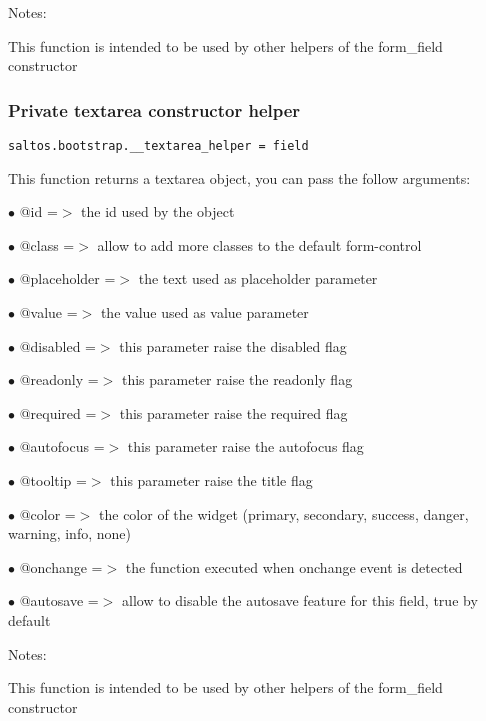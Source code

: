 \documentclass[a4paper]{article}
\begin{document}
Notes:

This function is intended to be used by other helpers of the form\_field constructor

\hypertarget{toc652}{}
\subsubsection{Private textarea constructor helper}

\begin{lstlisting}
saltos.bootstrap.__textarea_helper = field
\end{lstlisting}

This function returns a textarea object, you can pass the follow arguments:

\begin{compactitem}
\item[\color{myblue}$\bullet$] @id          =$>$ the id used by the object
\item[\color{myblue}$\bullet$] @class       =$>$ allow to add more classes to the default form-control
\item[\color{myblue}$\bullet$] @placeholder =$>$ the text used as placeholder parameter
\item[\color{myblue}$\bullet$] @value       =$>$ the value used as value parameter
\item[\color{myblue}$\bullet$] @disabled    =$>$ this parameter raise the disabled flag
\item[\color{myblue}$\bullet$] @readonly    =$>$ this parameter raise the readonly flag
\item[\color{myblue}$\bullet$] @required    =$>$ this parameter raise the required flag
\item[\color{myblue}$\bullet$] @autofocus   =$>$ this parameter raise the autofocus flag
\item[\color{myblue}$\bullet$] @tooltip     =$>$ this parameter raise the title flag
\item[\color{myblue}$\bullet$] @color       =$>$ the color of the widget (primary, secondary, success, danger, warning, info, none)
\item[\color{myblue}$\bullet$] @onchange    =$>$ the function executed when onchange event is detected
\item[\color{myblue}$\bullet$] @autosave    =$>$ allow to disable the autosave feature for this field, true by default
\end{compactitem}

Notes:

This function is intended to be used by other helpers of the form\_field constructor
\end{document}
